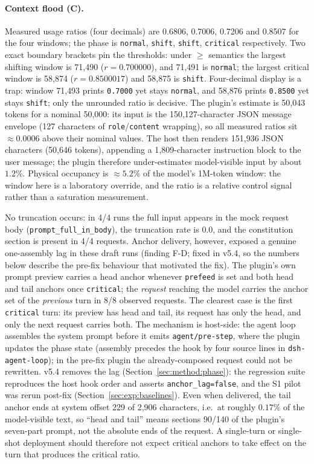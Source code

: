 \paragraph{Context flood (C).} Measured usage ratios (four decimals) are 0.6806,
0.7006, 0.7206 and 0.8507 for the four windows; the phase is
\texttt{normal}, \texttt{shift}, \texttt{shift}, \texttt{critical} respectively.
Two exact boundary brackets pin the thresholds: under $\ge$ semantics the largest
shifting window is 71{,}490 ($r=0.700000$), and 71{,}491 is \texttt{normal};
the largest critical window is 58{,}874 ($r=0.8500017$) and 58{,}875 is
\texttt{shift}. Four-decimal display is a trap: window 71{,}493 prints
\texttt{0.7000} yet stays \texttt{normal}, and 58{,}876 prints \texttt{0.8500}
yet stays \texttt{shift}; only the unrounded ratio is decisive. The plugin's
estimate is 50{,}043 tokens for a nominal 50{,}000: its input is the 150{,}127-character
JSON message envelope (127 characters of \texttt{role}/\texttt{content} wrapping),
so all measured ratios sit $\approx 0.0006$ above their nominal values. The host
then renders 151{,}936 JSON characters (50{,}646 tokens), appending a
1{,}809-character instruction block to the user message; the plugin therefore
under-estimates model-visible input by about $1.2\%$. Physical occupancy is
$\approx 5.2\%$ of the model's 1M-token window: the window here is a laboratory
override, and the ratio is a relative control signal rather than a saturation
measurement.

No truncation occurs: in 4/4 runs the full input appears in the mock request body
(\texttt{prompt\_\allowbreak{}full\_\allowbreak{}in\_\allowbreak{}body}), the truncation rate is 0.0, and the constitution
section is present in 4/4 requests. Anchor delivery, however, exposed a genuine
one-assembly lag in these draft runs (finding F-D; fixed in v5.4, so the numbers
below describe the pre-fix behaviour that motivated the fix). The plugin's own prompt preview carries a head anchor whenever
\texttt{prefeed} is set and both head and tail anchors once \texttt{critical};
the \emph{request} reaching the model carries the anchor set of the \emph{previous}
turn in 8/8 observed requests. The clearest case is the first \texttt{critical}
turn: its preview has head and tail, its request has only the head, and only the
next request carries both. The mechanism is host-side: the agent loop assembles the
system prompt before it emits \texttt{agent/pre-step}, where the plugin updates the
phase state (assembly precedes the hook by four source lines in
\texttt{dsh-agent-loop}); in the pre-fix plugin the already-composed request could
not be rewritten. v5.4 removes the lag (Section~\ref{sec:method:phase}): the
regression suite reproduces the host hook order and asserts
\texttt{anchor\_lag=false}, and the S1 pilot was rerun post-fix
(Section~\ref{sec:exp:baselines}).
Even when delivered, the tail anchor ends at system offset 229 of 2{,}906 characters,
i.e.\ at roughly $0.17\%$ of the model-visible text, so ``head and tail'' means
sections 90/140 of the plugin's seven-part prompt, not the absolute ends of the
request. A single-turn or single-shot deployment should therefore not expect
critical anchors to take effect on the turn that produces the critical ratio.


